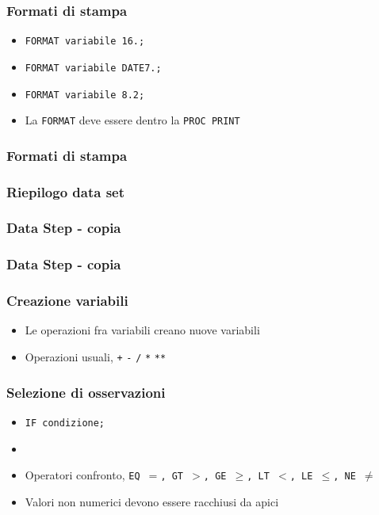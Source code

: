 \begin{frame}[containsverbatim]\frametitle{Formati di stampa}
  \begin{itemize}
  \item
    \verb!FORMAT variabile 16.;!
  \item
    \verb!FORMAT variabile DATE7.;!
  \item
    \verb!FORMAT variabile 8.2;!
  \item
    La \verb!FORMAT! deve essere dentro la \verb!PROC PRINT!
  \end{itemize}
\end{frame}

\begin{frame}[containsverbatim]\frametitle{Formati di stampa}
\end{frame}


\begin{frame}[containsverbatim]\frametitle{Riepilogo data set}
\end{frame}



\begin{frame}[fragile]\frametitle{Data Step - copia }
\end{frame}



\begin{frame}[fragile]\frametitle{Data Step - copia }
\end{frame}



\begin{frame}[fragile]\frametitle{Creazione variabili}

  \begin{itemize}
  \item
    Le operazioni fra variabili creano nuove variabili
  \item
    Operazioni usuali, \verb!+! \verb!-! \verb!/! \verb!*! \verb!**!
  \end{itemize}
\end{frame}




\begin{frame}[containsverbatim]\frametitle{Selezione di osservazioni}
  \begin{itemize}
  \item
    \verb!IF condizione;!
  \item
  \item
    Operatori confronto, \texttt{EQ $=$, GT $>$, GE $\geq$, LT $<$, LE $\leq$, NE $\neq$}
  \item
    Valori non numerici devono essere racchiusi da apici
  \end{itemize}\end{frame}


